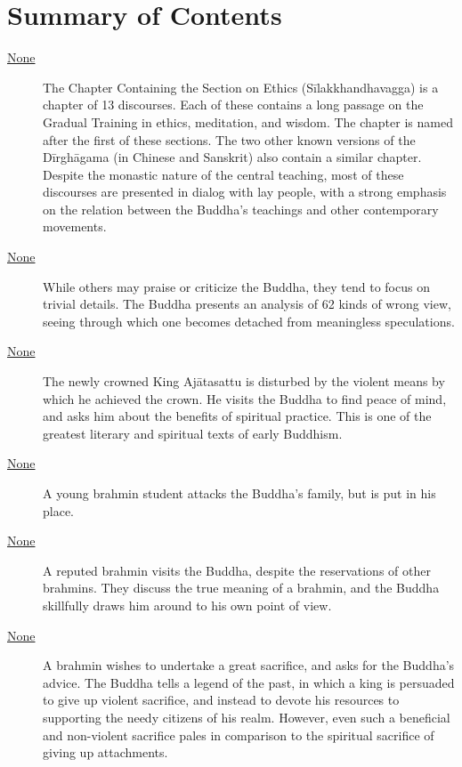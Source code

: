 \documentclass[12pt,openany]{book}%
\begin{document}
%
\chapter*{Summary of Contents}

\begin{description}%
\item[\href{\#dn{-}silakkhandhavagga}{None}] The Chapter Containing the Section on Ethics (\textsanskrit{Sīlakkhandhavagga}) is a chapter of 13 discourses. Each of these contains a long passage on the Gradual Training in ethics, meditation, and wisdom. The chapter is named after the first of these sections. The two other known versions of the \textsanskrit{Dīrghāgama} (in Chinese and Sanskrit) also contain a similar chapter. Despite the monastic nature of the central teaching, most of these discourses are presented in dialog with lay people, with a strong emphasis on the relation between the Buddha’s teachings and other contemporary movements.%
\item[\href{\#dn1}{None}] While others may praise or criticize the Buddha, they tend to focus on trivial details. The Buddha presents an analysis of 62 kinds of wrong view, seeing through which one becomes detached from meaningless speculations.%
\item[\href{\#dn2}{None}] The newly crowned King \textsanskrit{Ajātasattu} is disturbed by the violent means by which he achieved the crown. He visits the Buddha to find peace of mind, and asks him about the benefits of spiritual practice. This is one of the greatest literary and spiritual texts of early Buddhism.%
\item[\href{\#dn3}{None}] A young brahmin student attacks the Buddha’s family, but is put in his place.%
\item[\href{\#dn4}{None}] A reputed brahmin visits the Buddha, despite the reservations of other brahmins. They discuss the true meaning of a brahmin, and the Buddha skillfully draws him around to his own point of view.%
\item[\href{\#dn5}{None}] A brahmin wishes to undertake a great sacrifice, and asks for the Buddha’s advice. The Buddha tells a legend of the past, in which a king is persuaded to give up violent sacrifice, and instead to devote his resources to supporting the needy citizens of his realm. However, even such a beneficial and non-violent sacrifice pales in comparison to the spiritual sacrifice of giving up attachments.%

\end{description}
\end{document}
